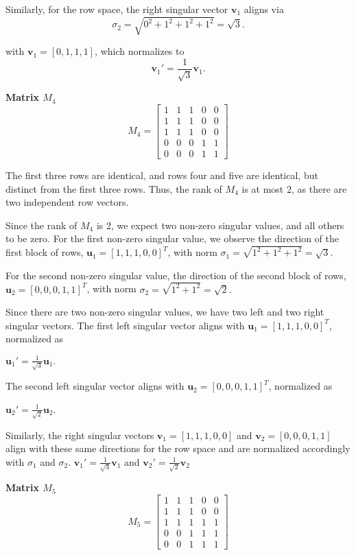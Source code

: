 \documentclass[a4paper,oneside,bibliography=totoc]{scrartcl}
\begin{document}
Similarly, for the row space, the right singular vector $\mathbf{v}_1$ aligns via 
\[
\sigma_2 = \sqrt{0^2 + 1^2 + 1^2 + 1^2} = \sqrt{3}.
\]

with $\mathbf{v}_1 = [0, 1, 1, 1]$, which normalizes to
\[
\mathbf{v}_1{\prime} = \frac{1}{\sqrt{3}} \mathbf{v}_1.
\]

\textbf{Matrix \( M_4 \)}
\[
M_4 = \begin{bmatrix} 1 & 1 & 1 & 0 & 0 \\ 1 & 1 & 1 & 0 & 0 \\ 1 & 1 & 1 & 0 & 0 \\ 0 & 0 & 0 & 1 & 1 \\ 0 & 0 & 0 & 1 & 1 \end{bmatrix}
\]

The first three rows are identical, and rows four and five are identical, but distinct from the first three rows. Thus, the rank of $M_4$ is at most $2$, as there are two independent row vectors.

Since the rank of $M_4$ is 2, we expect two non-zero singular values, and all others to be zero. For the first non-zero singular value, we observe the direction of the first block of rows, $\mathbf{u}_1 = [1, 1, 1, 0, 0]^T$, with norm $\sigma_1 = \sqrt{1^2 + 1^2 + 1^2} = \sqrt{3}$.

For the second non-zero singular value, the direction of the second block of rows, $\mathbf{u}_2 = [0, 0, 0, 1, 1]^T$, with norm $\sigma_2 = \sqrt{1^2 + 1^2} = \sqrt{2}.$

Since there are two non-zero singular values, we have two left and two right singular vectors. The first left singular vector aligns with $\mathbf{u}_1 = [1, 1, 1, 0, 0]^T$, normalized as

$\mathbf{u}_1{\prime} = \frac{1}{\sqrt{3}} \mathbf{u}_1.$

The second left singular vector aligns with $\mathbf{u}_2 = [0, 0, 0, 1, 1]^T$, normalized as

$\mathbf{u}_2{\prime} = \frac{1}{\sqrt{2}} \mathbf{u}_2$.

Similarly, the right singular vectors $\mathbf{v}_1 = [1, 1, 1, 0, 0]$ and $\mathbf{v}_2 = [0, 0, 0, 1, 1]$ align with these same directions for the row space and are normalized accordingly with $\sigma_1$ and $\sigma_2$.
$\mathbf{v}_1{\prime} = \frac{1}{\sqrt{3}} \mathbf{v}_1$ and $\mathbf{v}_2{\prime} = \frac{1}{\sqrt{2}} \mathbf{v}_2$

\textbf{Matrix \( M_5 \)}
\[
M_5 = \begin{bmatrix} 1 & 1 & 1 & 0 & 0 \\ 1 & 1 & 1 & 0 & 0 \\ 1 & 1 & 1 & 1 & 1 \\ 0 & 0 & 1 & 1 & 1 \\ 0 & 0 & 1 & 1 & 1 \end{bmatrix}
\]
\end{document}
